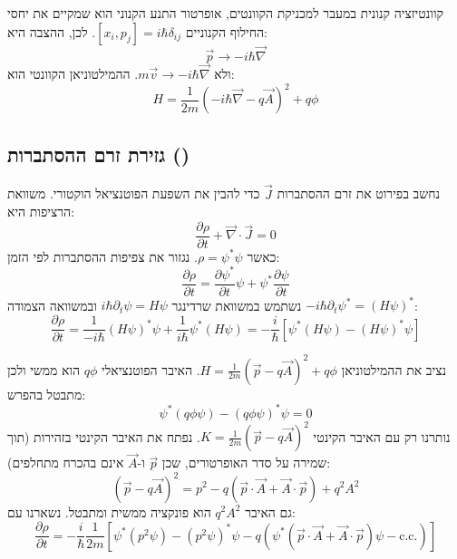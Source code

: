 \begin{notebox}{קוונטיזציה קנונית}
במעבר למכניקת הקוונטים, אופרטור התנע הקנוני הוא שמקיים את יחסי החילוף הקנוניים $[x_i, p_j] = i\hbar \delta_{ij}$. לכן, ההצבה היא:
\[
\vec{p} \to -i\hbar\vec{\nabla}
\]
ולא $m\vec{v} \to -i\hbar\vec{\nabla}$. ההמילטוניאן הקוונטי הוא:
\[
\boxed{H = \frac{1}{2m}\left(-i\hbar\vec{\nabla} - q\vec{A}\right)^2 + q\phi}
\]
\end{notebox}

\subsection{גזירת זרם ההסתברות ()}

נחשב בפירוט את זרם ההסתברות $\vec{J}$ כדי להבין את השפעת הפוטנציאל הוקטורי.
משוואת הרציפות היא:
\begin{equation}
\frac{\partial \rho}{\partial t} + \vec{\nabla}\cdot\vec{J} = 0
\end{equation}
כאשר $\rho = \psi^*\psi$. נגזור את צפיפות ההסתברות לפי הזמן:
\begin{equation}
\frac{\partial \rho}{\partial t} = \frac{\partial \psi^*}{\partial t}\psi + \psi^*\frac{\partial \psi}{\partial t}
\end{equation}
נשתמש במשוואת שרדינגר $i\hbar \partial_t \psi = H\psi$ ובמשוואה הצמודה $-i\hbar \partial_t \psi^* = (H\psi)^*$:
\begin{equation}
\frac{\partial \rho}{\partial t} = \frac{1}{-i\hbar}(H\psi)^*\psi + \frac{1}{i\hbar}\psi^*(H\psi) = -\frac{i}{\hbar} \left[ \psi^*(H\psi) - (H\psi)^*\psi \right]
\end{equation}

נציב את ההמילטוניאן $H = \frac{1}{2m}(\vec{p}-q\vec{A})^2 + q\phi$. האיבר הפוטנציאלי $q\phi$ הוא ממשי ולכן מתבטל בהפרש:
\[
\psi^*(q\phi\psi) - (q\phi\psi)^*\psi = 0
\]
נותרנו רק עם האיבר הקינטי $K = \frac{1}{2m}(\vec{p}-q\vec{A})^2$.
נפתח את האיבר הקינטי בזהירות (תוך שמירה על סדר האופרטורים, שכן $\vec{p}$ ו-$\vec{A}$ אינם בהכרח מתחלפים):
\begin{equation}
(\vec{p}-q\vec{A})^2 = p^2 - q(\vec{p}\cdot\vec{A} + \vec{A}\cdot\vec{p}) + q^2 A^2
\end{equation}
גם האיבר $q^2 A^2$ הוא פונקציה ממשית ומתבטל. נשארנו עם:
\begin{equation}
\frac{\partial \rho}{\partial t} = -\frac{i}{\hbar}\frac{1}{2m} \left[ \psi^*(p^2 \psi) - (p^2\psi)^*\psi - q\left( \psi^*(\vec{p}\cdot\vec{A} + \vec{A}\cdot\vec{p})\psi - \text{c.c.} \right) \right]
\end{equation}

